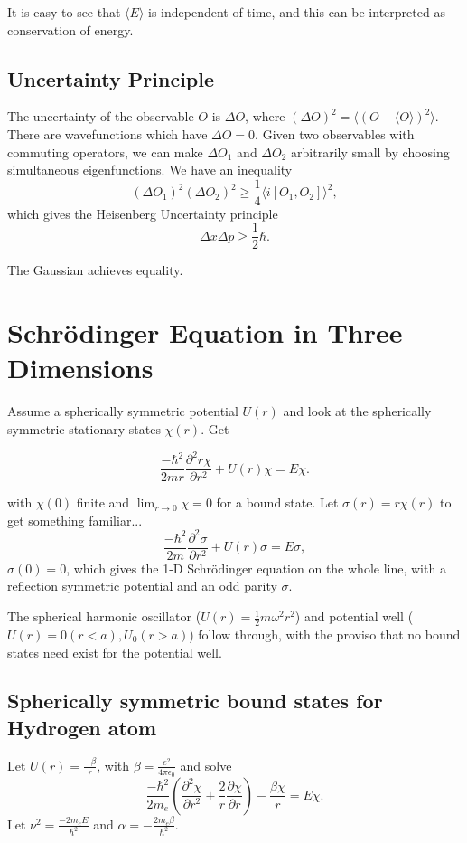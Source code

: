 \documentclass[a4paper]{article}
\newcommand{\eps}{\epsilon_0}
\newcommand{\pd}[2]{\frac{\partial #1}{\partial #2}}
\newcommand{\schrod}{Schr{\"o}dinger }
\newcommand{\com}[2]{\left[ #1,#2 \right]}
\begin{document}
It is easy to see that $\langle E \rangle$ is independent of time, and this
can be interpreted as conservation of energy.

\subsection{Uncertainty Principle}

The uncertainty of the observable $O$ is $\Delta O$, where $(\Delta O)^2= \langle (O - \langle O \rangle )^2 \rangle$.  There are wavefunctions which have
$\Delta O  = 0$.  Given two observables with commuting operators, we can make
$\Delta O_1$ and $\Delta O_2$ arbitrarily small by choosing simultaneous
eigenfunctions.  We have an inequality
\[
(\Delta O_1)^2 (\Delta O_2)^2 \ge \frac{1}{4} \langle i \com{O_1}{O_2} \rangle^2,
\]
which gives the Heisenberg Uncertainty principle
\[
\Delta x \Delta p \ge \frac{1}{2} \hbar.
\]

The Gaussian achieves equality.

\section{\schrod Equation in Three Dimensions}

Assume a spherically symmetric potential $U(r)$ and look at the spherically
symmetric stationary states $\chi(r)$.  Get

\[
\frac{-\hbar^2}{2 m r} \pd{^2 r \chi}{r^2} + U(r)\chi = E\chi.
\]

with $\chi(0)$ finite and $\lim_{r \rightarrow 0} \chi = 0$ for a bound state.
Let $\sigma(r) = r\chi(r)$ to get something familiar...
 \[
\frac{-\hbar^2}{2 m} \pd{^2 \sigma}{r^2} + U(r)\sigma = E\sigma,
\]
$\sigma(0)=0$, which gives the 1-D \schrod equation on the whole line, with
a reflection symmetric potential and an odd parity $\sigma$.

The spherical harmonic oscillator ($U(r) = \frac{1}{2}m \omega^2 r^2$) and
potential well ($U(r) = 0 (r < a), U_0 (r>a)$) follow through, with the proviso
that no bound states need exist for the potential well.

\subsection{Spherically symmetric bound states for Hydrogen atom}

Let $U(r) = \frac{-\beta}{r}$, with $\beta = \frac{e^2}{4 \pi \eps}$ and
solve
\[
\frac{-\hbar^2}{2 m_e}(\pd{^2\chi}{r^2}+\frac{2}{r}\pd{\chi}{r})
- \frac{\beta \chi}{r} = E \chi.
\]
Let $\nu^2 = \frac{-2 m_e E}{\hbar^2}$ and $\alpha = - \frac{2 m_e \beta}{\hbar^2}$.
\end{document}

